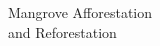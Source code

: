 \documentclass[preview]{standalone}
\begin{document}
\begin{center}
Mangrove Afforestation\\[0.4em] and Reforestation
\end{center}
\end{document}
